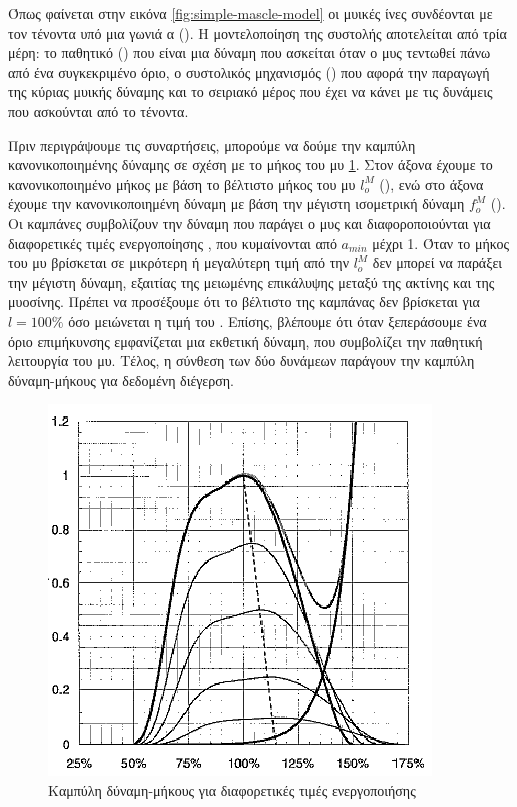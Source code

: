 Όπως φαίνεται στην εικόνα \ref{fig:simple-mascle-model} οι μυικές ίνες συνδέονται με τον τένοντα υπό μια γωνιά α (). Η μοντελοποίηση της συστολής αποτελείται από τρία μέρη: το παθητικό () που είναι μια δύναμη που ασκείται όταν ο μυς τεντωθεί πάνω από ένα συγκεκριμένο όριο, ο συστολικός μηχανισμός () που αφορά την παραγωγή της κύριας μυικής δύναμης και το σειριακό μέρος που έχει να κάνει με τις δυνάμεις που ασκούνται από το τένοντα.

Πριν περιγράψουμε τις συναρτήσεις, μπορούμε να δούμε την καμπύλη κανονικοποιημένης δύναμης σε σχέση με το μήκος του μυ \ref{fig:active-force-legnth}. Στον άξονα  έχουμε το κανονικοποιημένο μήκος με βάση το βέλτιστο μήκος του μυ $l^{M}_{o}$ (), ενώ στο άξονα  έχουμε την κανονικοποιημένη δύναμη με βάση την μέγιστη ισομετρική δύναμη $f^{M}_{o}$ (). Οι καμπάνες συμβολίζουν την δύναμη που παράγει ο μυς και διαφοροποιούνται για διαφορετικές τιμές ενεργοποίησης , που κυμαίνονται από $a_{min}$ μέχρι 1. Όταν το μήκος του μυ βρίσκεται σε μικρότερη ή μεγαλύτερη τιμή από την $l^{M}_{o}$ δεν μπορεί να παράξει την μέγιστη δύναμη, εξαιτίας της μειωμένης επικάλυψης μεταξύ της ακτίνης και της μυοσίνης. Πρέπει να προσέξουμε ότι το βέλτιστο της καμπάνας δεν βρίσκεται για $l = 100\%$ όσο μειώνεται η τιμή του . Επίσης, βλέπουμε ότι όταν ξεπεράσουμε ένα όριο επιμήκυνσης εμφανίζεται μια εκθετική δύναμη, που συμβολίζει την παθητική λειτουργία του μυ. Τέλος, η σύνθεση των δύο δυνάμεων παράγουν την καμπύλη δύναμη-μήκους για δεδομένη διέγερση.

\begin{figure}[H]
    \centering
    \includegraphics[width=.5\textwidth, height=.35\textheight]{neuromusculoskeletal/fig/active-force-legnth.png}
    \caption{Καμπύλη δύναμη-μήκους για διαφορετικές τιμές ενεργοποιήσης\cite{buchanan04}}
    \label{fig:active-force-legnth}
\end{figure}

